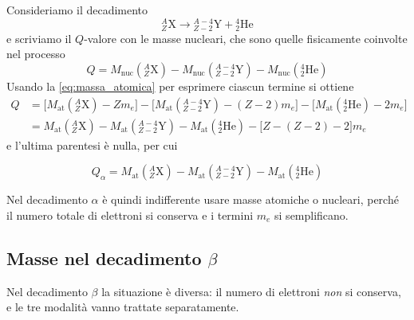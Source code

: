 Consideriamo il decadimento
%
\begin{equation*}
    {}^{A}_{Z}\mathrm{X} \longrightarrow {}^{A-4}_{Z-2}\mathrm{Y} + {}^{4}_{2}\mathrm{He}
\end{equation*}
e scriviamo il $Q$-valore con le masse nucleari, che sono quelle fisicamente coinvolte nel processo
%
\begin{equation}
    Q = M_{\text{nuc}}({}^{A}_{Z}\mathrm{X}) - M_{\text{nuc}}({}^{A-4}_{Z-2}\mathrm{Y}) - M_{\text{nuc}}({}^{4}_{2}\mathrm{He})
\end{equation}
Usando la \eqref{eq:massa_atomica} per esprimere ciascun termine si ottiene
%
\begin{equation}
\begin{aligned}
    Q & = \big[ M_{\text{at}}({}^{A}_{Z}\mathrm{X}) - Z m_e \big] - \big[ M_{\text{at}}({}^{A-4}_{Z-2}\mathrm{Y}) - (Z-2) m_e \big] - \big[ M_{\text{at}}({}^{4}_{2}\mathrm{He}) - 2 m_e \big] \\[4pt]
    & = M_{\text{at}}({}^{A}_{Z}\mathrm{X}) - M_{\text{at}}({}^{A-4}_{Z-2}\mathrm{Y}) - M_{\text{at}}({}^{4}_{2}\mathrm{He}) - \big[ Z - (Z-2) - 2 \big] m_e
\end{aligned}
\end{equation}
e l'ultima parentesi è nulla, per cui
%
\begin{tcolorbox}[colback=black!5!white, colframe=black!45!white, boxrule=0.8pt]
\begin{equation}
    Q_{\alpha} = M_{\text{at}}({}^{A}_{Z}\mathrm{X}) - M_{\text{at}}({}^{A-4}_{Z-2}\mathrm{Y}) - M_{\text{at}}({}^{4}_{2}\mathrm{He})
\end{equation}
\end{tcolorbox}
Nel decadimento $\alpha$ è quindi indifferente usare masse atomiche o nucleari, perché il numero totale di elettroni si conserva e i termini $m_e$ si semplificano. 

\subsection{Masse nel decadimento \texorpdfstring{$\beta$}{beta}}

Nel decadimento $\beta$ la situazione è diversa: il numero di elettroni \emph{non} si conserva, e le tre modalità vanno trattate separatamente.\\

